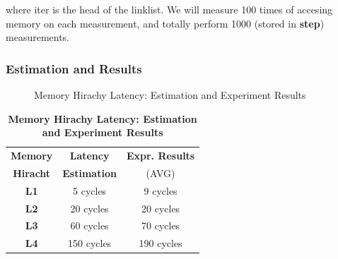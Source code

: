 where iter is the head of the linklist. We will measure 100 times of accesing memory on each measurement, and totally perform 1000 (stored in \textbf{step}) measurements.

\subsubsection{Estimation and Results}

\begin{figure}[ht]
    \centering
    \caption{Memory Hirachy Latency: Estimation and Experiment Results }
    \label{mem_latency_result}
\end{figure}

\begin{table}[ht]
  \centering
  \caption{\textbf{Memory Hirachy Latency: Estimation and Experiment Results}}
  \begin{threeparttable}
  \begin{tabular}{ccc}
  \hline
      \textbf{Memory}    & \textbf{Latency}   & \textbf{Expr. Results} \\
      \textbf{Hiracht}   & \textbf{Estimation}  & (AVG)   \\
  \hline
      \textbf{L1}  & 5 cycles & 9 cycles   \\
      \textbf{L2}  & 20 cycles & 20 cycles   \\
      \textbf{L3}  & 60 cycles & 70 cycles   \\
      \textbf{L4}  & 150 cycles & 190 cycles   \\
  \hline
  \end{tabular}
  \end{threeparttable}
  \label{memory_latency_table}
\end{table}

